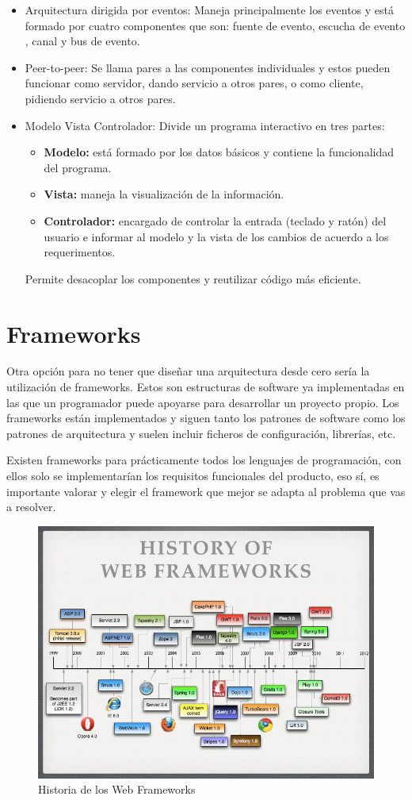 \documentclass[12pt]{report} %
\begin{document}
\begin{itemize}
\begin{itemize}
 	\end{itemize}
 	\item Arquitectura dirigida por eventos: Maneja principalmente los eventos y está formado por cuatro componentes que son: fuente de evento, escucha de evento , canal y bus de evento.
 	\item Peer-to-peer: Se llama pares a las componentes individuales y estos pueden funcionar como servidor, dando servicio a otros pares, o como cliente, pidiendo servicio a otros pares.
 	\item Modelo Vista Controlador: Divide un programa interactivo en tres partes:
 		\begin{itemize}
 			\item \textbf{Modelo:} está formado por los datos básicos y contiene la funcionalidad del programa. 
 			\item \textbf{Vista:} maneja la visualización de la información. 
 			\item \textbf{Controlador:} encargado de controlar la entrada (teclado y ratón) del usuario e informar al modelo y la vista de los cambios de acuerdo a los requerimentos.
 		\end{itemize}
 	Permite desacoplar los componentes y reutilizar código más eficiente. 
 \end{itemize}

\section{Frameworks}
 Otra opción para no tener que diseñar una arquitectura desde cero sería la utilización de frameworks. Estos son estructuras de software ya implementadas en las que un programador puede apoyarse para desarrollar un proyecto propio. Los frameworks están implementados y siguen tanto los patrones de software como los patrones de arquitectura y suelen incluir ficheros de configuración, librerías, etc.
 
 Existen frameworks para prácticamente todos los lenguajes de programación, con ellos solo se implementarían los requisitos funcionales del producto, eso sí, es importante valorar y elegir el framework que mejor se adapta al problema que vas a resolver.
 
  \begin{figure}
 	\centering
 	\includegraphics[width=0.7\linewidth]{imagenes/the-future-of-web-frameworks-11-728}
 	\caption{Historia de los Web Frameworks}
 	\label{fig:webFrameworks}
 \end{figure}
\end{document}
